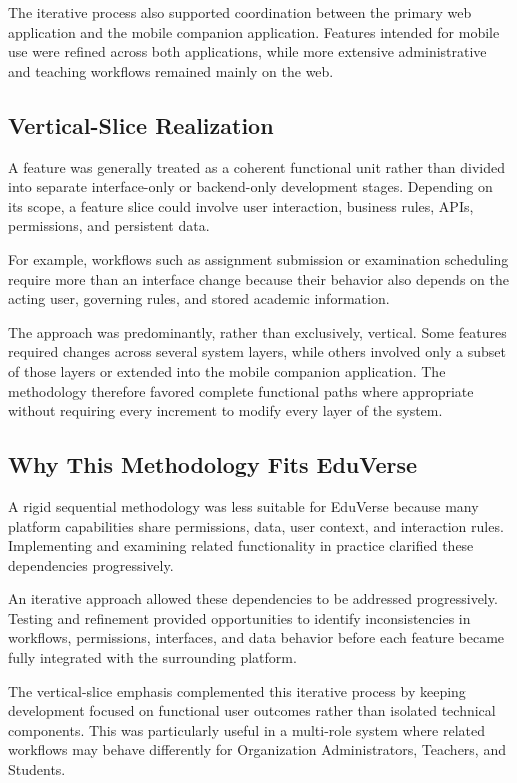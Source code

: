 The iterative process also supported coordination between the primary
web application and the mobile companion application. Features intended for mobile use were refined across both applications, while more extensive administrative and teaching workflows remained mainly on the web.

\subsection{Vertical-Slice Realization}\label{subsec:vertical_slice_development_approach}

A feature was generally treated as a coherent functional unit rather than
divided into separate interface-only or backend-only development stages.
Depending on its scope, a feature slice could involve user interaction,
business rules, APIs, permissions, and persistent data.

For example, workflows such as assignment submission or examination scheduling
require more than an interface change because their behavior also depends on
the acting user, governing rules, and stored academic information.

The approach was predominantly, rather than exclusively, vertical. Some
features required changes across several system layers, while others involved
only a subset of those layers or extended into the mobile companion
application. The methodology therefore favored complete functional paths where
appropriate without requiring every increment to modify every layer of the
system.

\subsection{Why This Methodology Fits EduVerse}\label{subsec:justification_for_methodology_selection}

A rigid sequential methodology was less suitable for EduVerse because many
platform capabilities share permissions, data, user context, and interaction
rules. Implementing and examining related functionality in practice clarified
these dependencies progressively.

An iterative approach allowed these dependencies to be addressed progressively.
Testing and refinement provided opportunities to identify inconsistencies in
workflows, permissions, interfaces, and data behavior before each feature
became fully integrated with the surrounding platform.

The vertical-slice emphasis complemented this iterative process by keeping
development focused on functional user outcomes rather than isolated technical
components. This was particularly useful in a multi-role system where related
workflows may behave differently for Organization Administrators, Teachers,
and Students.

